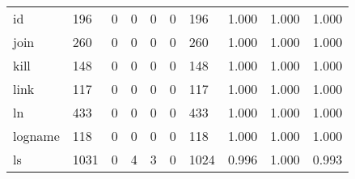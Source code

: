 \begin{longtable}{lp{1.3cm}p{1.3cm}p{1.3cm}p{1.3cm}p{1.3cm}p{1.3cm}p{1.3cm}p{1.3cm}p{1.3cm}}
id        &                    196 &                                  0 &                                 0 &                                0 &                                 0 &                             196 &                                   1.000 &                                  1.000 &                                1.000 \\
join      &                    260 &                                  0 &                                 0 &                                0 &                                 0 &                             260 &                                   1.000 &                                  1.000 &                                1.000 \\
kill      &                    148 &                                  0 &                                 0 &                                0 &                                 0 &                             148 &                                   1.000 &                                  1.000 &                                1.000 \\
link      &                    117 &                                  0 &                                 0 &                                0 &                                 0 &                             117 &                                   1.000 &                                  1.000 &                                1.000 \\
ln        &                    433 &                                  0 &                                 0 &                                0 &                                 0 &                             433 &                                   1.000 &                                  1.000 &                                1.000 \\
logname   &                    118 &                                  0 &                                 0 &                                0 &                                 0 &                             118 &                                   1.000 &                                  1.000 &                                1.000 \\
ls        &                   1031 &                                  0 &                                 4 &                                3 &                                 0 &                            1024 &                                   0.996 &                                  1.000 &                                0.993 \\

\end{longtable}
